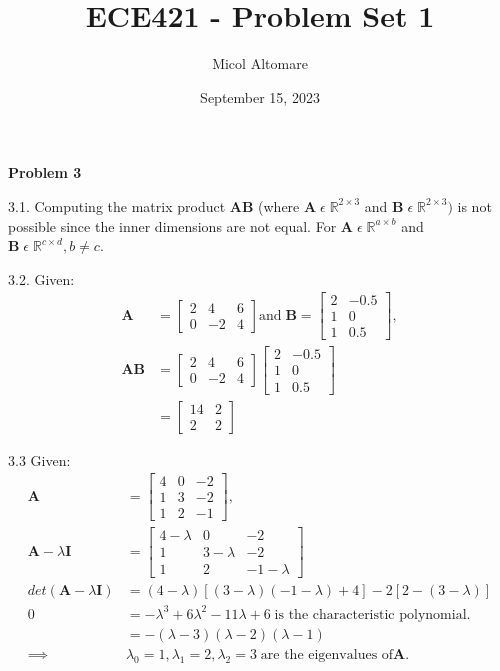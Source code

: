 \documentclass{article}
\title{ECE421 - Problem Set 1}
\author{Micol Altomare}
\date{September 15, 2023}
\begin{document}
	\maketitle
\textbf{Problem 3}

\hfill

3.1. Computing the matrix product \textbf{AB} (where $\mathbf{A} \; \epsilon \; \mathbb{R}^{2 \times 3}$ and $\mathbf{B} \; \epsilon \; \mathbb{R}^{2 \times 3})$ is not possible since the inner dimensions are not equal. For $\mathbf{A} \; \epsilon \; \mathbb{R}^{a \times b}$ and $\mathbf{B} \; \epsilon \; \mathbb{R}^{c \times d}, b \neq c$.

\hfill

3.2. Given:
\begin{align*}
\mathbf{A} &= \begin{bmatrix} 2 & 4 & 6\\ 0 & -2 & 4 \end{bmatrix}
\text{and} \;  
\mathbf{B} = \begin{bmatrix} 2 & -0.5 \\ 1 & 0 \\ 1 & 0.5 \end{bmatrix}, \\
\mathbf{AB} &= \begin{bmatrix} 2 & 4 & 6\\ 0 & -2 & 4 \end{bmatrix}  \begin{bmatrix} 2 & -0.5 \\ 1 & 0 \\ 1 & 0.5 \end{bmatrix} \\
&= \begin{bmatrix} 14 & 2 \\ 2 & 2 \end{bmatrix}
\end{align*}


\hfill

3.3 Given:
\begin{align*}
\mathbf{A} &= \begin{bmatrix} 4 & 0 & -2\\ 1 & 3 & -2 \\ 1 & 2 & -1 \end{bmatrix}, \\
\mathbf{A} - \lambda \mathbf{I} &= \begin{bmatrix} 4 - \lambda & 0 & -2\\ 1 & 3-\lambda & -2 \\ 1 & 2 & -1-\lambda \end{bmatrix} \\
det(\mathbf{A} - \lambda \mathbf{I}) &= (4-\lambda)[(3-\lambda)(-1-\lambda)+4]-2[2-(3-\lambda)] \\
0 &= \boxed{-\lambda^3 + 6\lambda^2 - 11\lambda + 6} \; \text{is the characteristic polynomial}. \\
&= -(\lambda-3)(\lambda-2)(\lambda-1) \\
\implies & \boxed{\lambda_0 = 1, \lambda_1 = 2, \lambda_2 = 3} \; \text{are the eigenvalues of} \mathbf{A}.
\end{align*}
\end{document}
